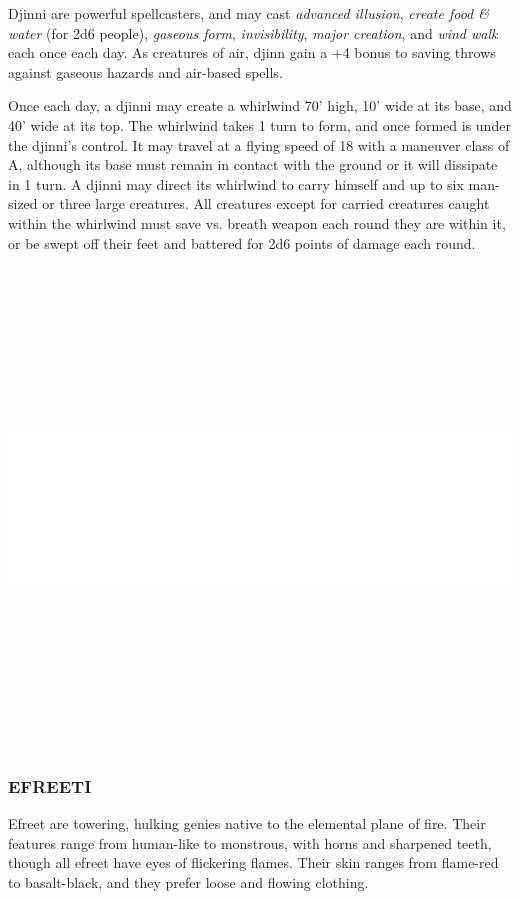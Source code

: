 \begin{multicols}{2}
Djinni are powerful spellcasters, and may cast \textit{advanced illusion}, \textit{create food \& water} (for 2d6 people), \textit{gaseous form}, \textit{invisibility}, \textit{major creation}, and \textit{wind walk} each once each day. As creatures of air, djinn gain a +4 bonus to saving throws against gaseous hazards and air-based spells.

Once each day, a djinni may create a whirlwind 70' high, 10' wide at its base, and 40' wide at its top. The whirlwind takes 1 turn to form, and once formed is under the djinni's control. It may travel at a flying speed of 18 with a maneuver class of A, although its base must remain in contact with the ground or it will dissipate in 1 turn. A djinni may direct its whirlwind to carry himself and up to six man-sized or three large creatures. All creatures except for carried creatures caught within the whirlwind must save vs. breath weapon each round they are within it, or be swept off their feet and battered for 2d6 points of damage each round.

\noindent\includegraphics[width=\columnwidth, height=5in]{testblock.pdf}

\subsubsection{EFREETI}

Efreet are towering, hulking genies native to the elemental plane of fire. Their features range from human-like to monstrous, with horns and sharpened teeth, though all efreet have eyes of flickering flames. Their skin ranges from flame-red to basalt-black, and they prefer loose and flowing clothing.


\end{multicols}
